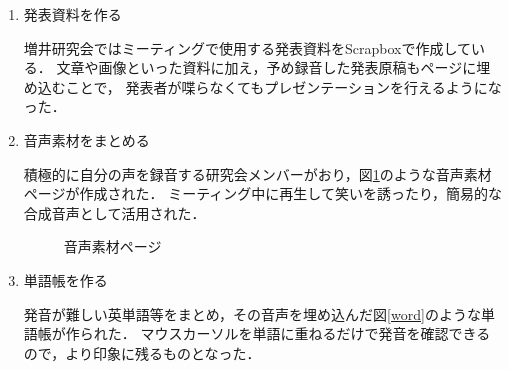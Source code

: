 \begin{enumerate}

\item 発表資料を作る

増井研究会ではミーティングで使用する発表資料をScrapboxで作成している．
文章や画像といった資料に加え，予め録音した発表原稿もページに埋め込むことで，
発表者が喋らなくてもプレゼンテーションを行えるようになった．

\item 音声素材をまとめる

積極的に自分の声を録音する研究会メンバーがおり，図\ref{hayakawa}のような音声素材ページが作成された．
ミーティング中に再生して笑いを誘ったり，簡易的な合成音声として活用された．

\begin{figure}[H]
\centering
{}
\caption{音声素材ページ}
\label{hayakawa}
\end{figure}

\item 単語帳を作る

発音が難しい英単語等をまとめ，その音声を埋め込んだ図\ref{word}のような単語帳が作られた．
マウスカーソルを単語に重ねるだけで発音を確認できるので，より印象に残るものとなった．


\end{enumerate}
